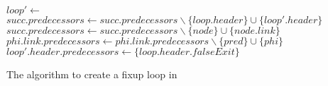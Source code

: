 \begin{algorithm}[H]
    \begin{algorithmic}
            \State $loop' \gets\text{ }$ 
                    \State $succ.predecessors \gets succ.predecessors \backslash \{loop.header\} \cup \{loop'.header\}$
                \EndIf
            \EndFor
                        \State $succ.predecessors \gets succ.predecessors \backslash \{node\} \cup \{node.link\}$
                    \EndIf
                \EndFor
            \EndFor
                        \State $phi.link.predecessors \gets phi.link.predecessors \backslash \{pred\} \cup \{phi\}$
                    \EndIf
                \EndFor
            \EndFor
            \State $loop'.header.predecessors \gets \{loop.header.falseExit\}$
        \EndFunction
    \end{algorithmic}
    \caption{The algorithm to create a fixup loop in~\libFIRM}
    \label{alg:impl:fixup:loop:fixup-loop}
\end{algorithm}